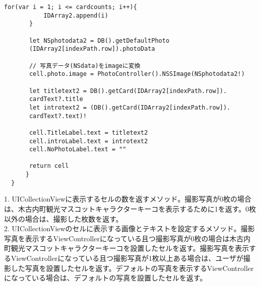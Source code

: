 \begin{description}
\begin{lstlisting}[basicstyle=\ttfamily\footnotesize, frame=single]
       for(var i = 1; i <= cardcounts; i++){
           IDArray2.append(i)
       }
            
       let NSphotodata2 = DB().getDefaultPhoto
       (IDArray2[indexPath.row]).photoData
       
       // 写真データ(NSdata)をimageに変換
       cell.photo.image = PhotoController().NSSImage(NSphotodata2!)
            
       let titletext2 = DB().getCard(IDArray2[indexPath.row]).
       cardText?.title
       let introtext2 = (DB().getCard(IDArray2[indexPath.row]).
       cardText?.text)!
            
       cell.TitleLabel.text = titletext2
       cell.introLabel.text = introtext2
       cell.NoPhotoLabel.text = ""
            
       return cell
      }
  }
 \end{lstlisting}

1. UICollectionViewに表示するセルの数を返すメソッド。撮影写真が0枚の場合は、木古内町観光マスコットキャラクターキーコを表示するために1を返す。0枚以外の場合は、撮影した枚数を返す。 \\
2. UICollectionViewのセルに表示する画像とテキストを設定するメソッド。撮影写真を表示するViewControllerになっている且つ撮影写真が0枚の場合は木古内町観光マスコットキャラクターキーコを設置したセルを返す。撮影写真を表示するViewControllerになっている且つ撮影写真が1枚以上ある場合は、ユーザが撮影した写真を設置したセルを返す。デフォルトの写真を表示するViewControllerになっている場合は、デフォルトの写真を設置したセルを返す。
\end{description}

